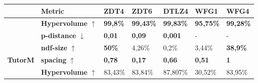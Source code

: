 \begin{table}[]
    \centering
    \begin{tabular}{@{}lllllll@{}}
    \toprule
                                                                                              & Metric      & ZDT4                                     & ZDT6                                     & DTLZ4                                     & WFG1                                     & WFG4                                     \\ \midrule
                                                                                              & \textbf{Hypervolume} $\uparrow$  & \cellcolor[HTML]{EFEFEF}\textbf{99,8\%} & \cellcolor[HTML]{EFEFEF}\textbf{99,43\%} & \cellcolor[HTML]{EFEFEF}\textbf{99,83\%} & \cellcolor[HTML]{EFEFEF}\textbf{95,75\%} & \cellcolor[HTML]{EFEFEF}\textbf{99,28\%} \\
                                                                                              & \textbf{p-distance} $\downarrow$  & \cellcolor[HTML]{EFEFEF}\textbf{0,01}    & \cellcolor[HTML]{EFEFEF}\textbf{0,09}    & \cellcolor[HTML]{EFEFEF}\textbf{0,001}    & -                                        & -                                        \\
                                                                                              & \textbf{ndf-size} $\uparrow$     & \cellcolor[HTML]{EFEFEF}\textbf{50\%}                          & 4,26\%                                   & 0,2\%                                     & 3,44\%                                   & \cellcolor[HTML]{EFEFEF}\textbf{38,9\%} \\
    \multirow{-4}{*}{\textbf{TutorM}}                                                         & \textbf{spacing} $\uparrow$      & \cellcolor[HTML]{EFEFEF}\textbf{0,78}    & \cellcolor[HTML]{EFEFEF}\textbf{0,17}    & \cellcolor[HTML]{EFEFEF}\textbf{0,66}    & \cellcolor[HTML]{EFEFEF}\textbf{0,51}    & \cellcolor[HTML]{EFEFEF}\textbf{1}       \\ \midrule
                                                                                              & \textbf{Hypervolume} $\uparrow$  & 83,43\%                                  & 83,84\%                                  & 87,807\%                                  & 30,52\%                                  & 83,95\%                                  \\ 

\end{tabular}
\end{table}
